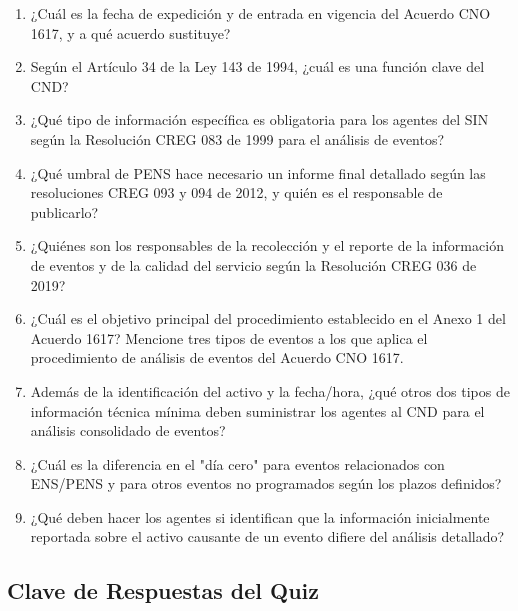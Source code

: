 \documentclass[a5paper]{book}%
\begin{document}
\begin{enumerate}
\item ¿Cuál es la fecha de expedición y de entrada en vigencia del Acuerdo CNO 1617, y a qué acuerdo sustituye?
\item Según el Artículo 34 de la Ley 143 de 1994, ¿cuál es una función clave del CND?
\item ¿Qué tipo de información específica es obligatoria para los agentes del SIN según la Resolución CREG 083 de 1999 para el análisis de eventos?
\item ¿Qué umbral de PENS hace necesario un informe final detallado según las resoluciones CREG 093 y 094 de 2012, y quién es el responsable de publicarlo?
\item ¿Quiénes son los responsables de la recolección y el reporte de la información de eventos y de la calidad del servicio según la Resolución CREG 036 de 2019?
\item ¿Cuál es el objetivo principal del procedimiento establecido en el Anexo 1 del Acuerdo 1617?
    Mencione tres tipos de eventos a los que aplica el procedimiento de análisis de eventos del Acuerdo CNO 1617.
  \item Además de la identificación del activo y la fecha/hora, ¿qué otros dos tipos de información técnica mínima deben suministrar los agentes al CND para el análisis consolidado de eventos?
  \item ¿Cuál es la diferencia en el "día cero" para eventos relacionados con ENS/PENS y para otros eventos no programados según los plazos definidos?
  \item ¿Qué deben hacer los agentes si identifican que la información inicialmente reportada sobre el activo causante de un evento difiere del análisis detallado?
  \end{enumerate}
  
  \subsection{Clave de Respuestas del Quiz}
\end{document}
